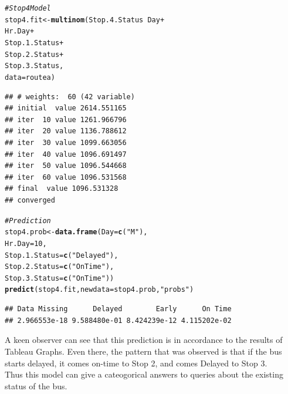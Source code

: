 \documentclass[12pt]{article}\usepackage[]{graphicx}\usepackage[]{color}
\makeatletter
\newcommand{\hlnum}[1]{\textcolor[rgb]{0.686,0.059,0.569}{#1}}%
\newcommand{\hlstr}[1]{\textcolor[rgb]{0.192,0.494,0.8}{#1}}%
\newcommand{\hlcom}[1]{\textcolor[rgb]{0.678,0.584,0.686}{\textit{#1}}}%
\newcommand{\hlopt}[1]{\textcolor[rgb]{0,0,0}{#1}}%
\newcommand{\hlstd}[1]{\textcolor[rgb]{0.345,0.345,0.345}{#1}}%
\newcommand{\hlkwb}[1]{\textcolor[rgb]{0.69,0.353,0.396}{#1}}%
\newcommand{\hlkwc}[1]{\textcolor[rgb]{0.333,0.667,0.333}{#1}}%
\newcommand{\hlkwd}[1]{\textcolor[rgb]{0.737,0.353,0.396}{\textbf{#1}}}%
\newenvironment{kframe}{%
 \def\at@end@of@kframe{}%
 \ifinner\ifhmode%
  \def\at@end@of@kframe{\end{minipage}}%
  \begin{minipage}{\columnwidth}%
 \fi\fi%
 \def\FrameCommand##1{\hskip\@totalleftmargin \hskip-\fboxsep
 \colorbox{shadecolor}{##1}\hskip-\fboxsep
     \hskip-\linewidth \hskip-\@totalleftmargin \hskip\columnwidth}%
 \MakeFramed {\advance\hsize-\width
   \@totalleftmargin\z@ \linewidth\hsize
   \@setminipage}}%
 {\par\unskip\endMakeFramed%
 \at@end@of@kframe}
\newenvironment{knitrout}{}{} %
\makeatother
\begin{document}
\begin{knitrout}
\begin{kframe}
\begin{verbatim}
\end{verbatim}
\begin{alltt}
\hlcom{# Stop 4 Model}
\hlstd{stop4.fit}\hlkwb{<-}\hlkwd{multinom}\hlstd{(Stop.4.Status}\hlopt{~}\hlstd{Day}\hlopt{+}
                                                \hlstd{Hr.Day}\hlopt{+}
                                                \hlstd{Stop.1.Status}\hlopt{+}
                                                \hlstd{Stop.2.Status}\hlopt{+}
                                                \hlstd{Stop.3.Status,}
                                        \hlkwc{data}\hlstd{=routea)}
\end{alltt}
\begin{verbatim}
## # weights:  60 (42 variable)
## initial  value 2614.551165 
## iter  10 value 1261.966796
## iter  20 value 1136.788612
## iter  30 value 1099.663056
## iter  40 value 1096.691497
## iter  50 value 1096.544668
## iter  60 value 1096.531568
## final  value 1096.531328 
## converged
\end{verbatim}
\begin{alltt}
\hlcom{#Prediction}
\hlstd{stop4.prob}\hlkwb{<-}\hlkwd{data.frame}\hlstd{(}\hlkwc{Day}\hlstd{=}\hlkwd{c}\hlstd{(}\hlstr{"M"}\hlstd{),}
                                           \hlkwc{Hr.Day}\hlstd{=}\hlnum{10}\hlstd{,}
                                           \hlkwc{Stop.1.Status}\hlstd{=}\hlkwd{c}\hlstd{(}\hlstr{"Delayed"}\hlstd{),}
                                           \hlkwc{Stop.2.Status}\hlstd{=}\hlkwd{c}\hlstd{(}\hlstr{"On Time"}\hlstd{),}
                                           \hlkwc{Stop.3.Status}\hlstd{=}\hlkwd{c}\hlstd{(}\hlstr{"On Time"}\hlstd{))}
\hlkwd{predict}\hlstd{(stop4.fit,}\hlkwc{newdata} \hlstd{= stop4.prob,}\hlstr{"probs"}\hlstd{)}
\end{alltt}
\begin{verbatim}
## Data Missing      Delayed        Early      On Time 
## 2.966553e-18 9.588480e-01 8.424239e-12 4.115202e-02
\end{verbatim}
\end{kframe}
\end{knitrout}
A keen observer can see that this prediction is in accordance to the results of Tableau Graphs. Even there, the pattern that was observed is that if the bus starts delayed, it comes on-time to Stop 2, and comes Delayed to Stop 3.\\

Thus this model can give a cateogorical answers to queries about the existing status of the bus.\\
\end{document}
